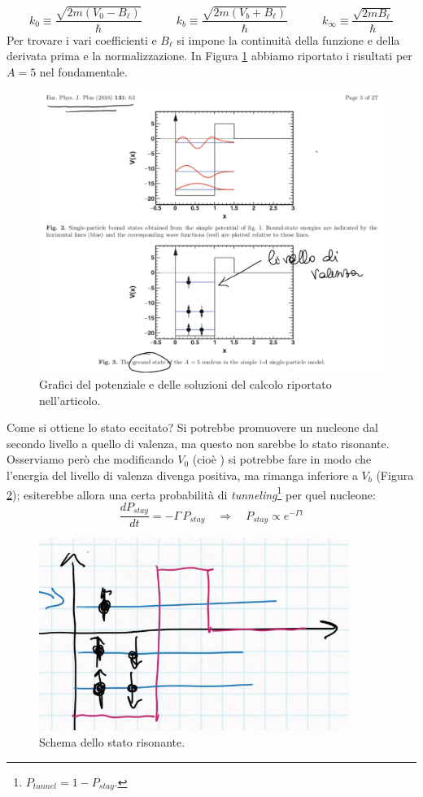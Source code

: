 $$k_0 \equiv \frac{\sqrt{2m(V_0-B_\ell)}}{\hbar}\qquad\quad k_b\equiv\frac{\sqrt{2m(V_b+B_\ell)}}{\hbar}\qquad\quad k_\infty\equiv\frac{\sqrt{2mB_\ell}}{\hbar}$$
Per trovare i vari coefficienti e $B_\ell$ si impone la continuità della funzione e della derivata prima e la normalizzazione. In Figura \ref{0325_ris} abbiamo riportato i risultati per $A=5$ nel fondamentale. 
\begin{figure}[!hb]
    \centering
    \includegraphics[scale=0.3]{Immagini/0325_risonanza.png}
    \caption{Grafici del potenziale e delle soluzioni del calcolo riportato nell'articolo.}
    \label{0325_ris}
\end{figure}
\noindent Come si ottiene lo stato eccitato? Si potrebbe promuovere un nucleone dal secondo livello a quello di valenza, ma questo non sarebbe lo stato risonante. Osserviamo però che modificando $V_0$ (cioè ) si potrebbe fare in modo che l'energia del livello di valenza divenga positiva, ma rimanga inferiore a $V_b$ (Figura \ref{0325_potris}); esiterebbe allora una certa probabilità di \textit{tunneling}\footnote{$P_{tunnel} = 1 - P_{stay}$.} per quel nucleone:
$$\frac{dP_{stay}}{dt} = -\Gamma \, P_{stay} \quad \Rightarrow \quad P_{stay}\propto e^{-\Gamma t}$$
\begin{figure}[h]
    \centering
    \includegraphics{Immagini/0325_po_risonanza.png}
    \caption{Schema dello stato risonante.}
    \label{0325_potris}
\end{figure}
